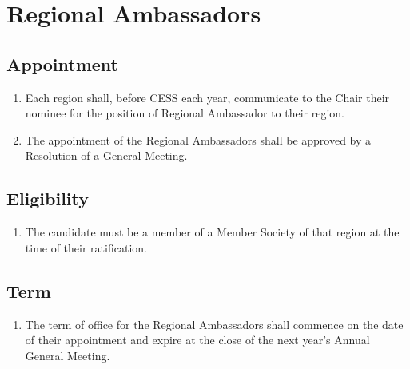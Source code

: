 \section{Regional Ambassadors}
\label{regional-ambassadors}

\subsection{Appointment}
\label{regional-ambassadors-appointment}

\begin{enumerate}
 \item Each region shall, before CESS each year, communicate to the Chair their nominee for the position of Regional Ambassador to their region.
 \item The appointment of the Regional Ambassadors shall be approved by a Resolution of a General Meeting.
\end{enumerate}

\subsection{Eligibility}
\label{regional-ambassadors-eligibility}

\begin{enumerate}
 \item The candidate must be a member of a Member Society of that region at the time of their ratification.
\end{enumerate}

\subsection{Term}
\label{regional-ambassadors-term}

\begin{enumerate}
 \item The term of office for the Regional Ambassadors shall commence on the date of their appointment and expire at the close of the next year’s Annual General Meeting.
\end{enumerate}

